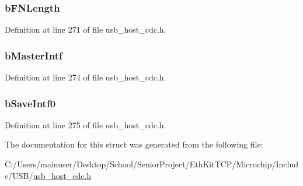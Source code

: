\subsubsection[{b\+F\+N\+Length}]{ b\+F\+N\+Length}\label{struct___u_s_b___c_d_c___u_n_i_o_n___f_n___d_s_c_a5cba7e463fbde92bb6daf4547a127a28}


Definition at line 271 of file usb\+\_\+host\+\_\+cdc.\+h.

\hypertarget{struct___u_s_b___c_d_c___u_n_i_o_n___f_n___d_s_c_aefe11dee2e95d1c4ef5715e4face1acf}{}
\subsubsection[{b\+Master\+Intf}]{ b\+Master\+Intf}\label{struct___u_s_b___c_d_c___u_n_i_o_n___f_n___d_s_c_aefe11dee2e95d1c4ef5715e4face1acf}


Definition at line 274 of file usb\+\_\+host\+\_\+cdc.\+h.

\hypertarget{struct___u_s_b___c_d_c___u_n_i_o_n___f_n___d_s_c_a4db1c24396728ae8cb7b819d13f7b10d}{}
\subsubsection[{b\+Save\+Intf0}]{ b\+Save\+Intf0}\label{struct___u_s_b___c_d_c___u_n_i_o_n___f_n___d_s_c_a4db1c24396728ae8cb7b819d13f7b10d}


Definition at line 275 of file usb\+\_\+host\+\_\+cdc.\+h.



The documentation for this struct was generated from the following file\+:\begin{DoxyCompactItemize}
\item 
C\+:/\+Users/mainuser/\+Desktop/\+School/\+Senior\+Project/\+Eth\+Kit\+T\+C\+P/\+Microchip/\+Include/\+U\+S\+B/\hyperlink{usb__host__cdc_8h}{usb\+\_\+host\+\_\+cdc.\+h}\end{DoxyCompactItemize}
